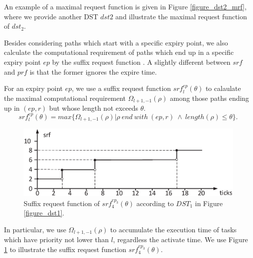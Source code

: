 \documentclass[sigconf]{acmart}
\begin{document}
An example of a maximal request function is given in Figure \ref{figure_dst2_mrf}, where we provide another DST $dst2$ and illustrate the maximal request function of $dst_2$.

Besides considering paths which start with a specific expiry point, we also calculate the computational requirement of paths which end up in a specific expiry point $ep$ by the suffix request function \cite{DBLP:journals/rts/Stigge015a}. A slightly different between $srf$ and $prf$ is that the former ignores the expire time.%

\begin{definition}
For an expiry point $ep$, we use a suffix request function $srf^{ep}_{l}(\theta)$ to calaulate the maximal computational requirement $\Omega_{l+1,-1}(\rho)$ among those paths ending up in $(ep,r)$ but whose length not exceeds $\theta$.
\begin{equation}
srf^{ep}_l(\theta)=max\{\Omega_{l+1,-1}(\rho)|\rho\ end\ with\ (ep,r)\ \wedge\ length(\rho)\leq \theta\}.
\end{equation}\label{equation_srf}
\end{definition}
\begin{figure}[t]
  \centering
  \includegraphics[scale=0.31]{graphics/figure_srf.eps}
  \caption{Suffix request function of $srf^{ep_3}_{4}(\theta)$ according to $DST_1$ in Figure \ref{figure_dst1}.} 
  \label{figure_srf}
\end{figure}

In particular, we use $\Omega_{l+1,-1}(\rho)$ to accumulate the execution time of tasks which have priority not lower than $l$, regardless the activate time. We use Figure \ref{figure_srf} to illustrate the suffix request function $srf^{ep_3}_{4}(\theta)$.

\end{document}
